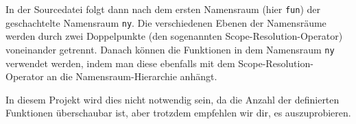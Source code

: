 In der Sourcedatei folgt dann nach dem ersten Namensraum (hier \lstinline{fun}) der geschachtelte Namensraum \lstinline{ny}. Die verschiedenen Ebenen der Namensräume werden durch zwei Doppelpunkte (den sogenannten Scope-Resolution-Operator) voneinander getrennt.
Danach können die Funktionen in dem Namensraum \lstinline{ny} verwendet werden, indem man diese ebenfalls mit dem Scope-Resolution-Operator an die Namensraum-Hierarchie anhängt.


In diesem Projekt wird dies nicht notwendig sein, da die Anzahl der definierten Funktionen überschaubar ist, aber trotzdem empfehlen wir dir, es auszuprobieren.

